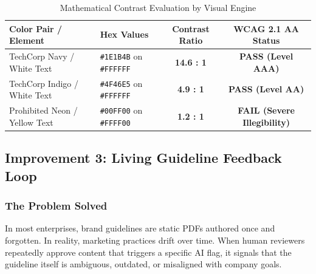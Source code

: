 \documentclass[11pt,a4paper]{article}
\begin{document}
\begin{table}[H]
\centering
\small
\begin{tabular}{@{}llcc@{}}
\toprule
\textbf{Color Pair / Element} & \textbf{Hex Values} & \textbf{Contrast Ratio} & \textbf{WCAG 2.1 AA Status} \\
\midrule
TechCorp Navy / White Text & \texttt{\#1E1B4B} on \texttt{\#FFFFFF} & \textbf{14.6 : 1} & \textcolor{successgreen}{\textbf{PASS (Level AAA)}} \\
TechCorp Indigo / White Text & \texttt{\#4F46E5} on \texttt{\#FFFFFF} & \textbf{4.9 : 1} & \textcolor{successgreen}{\textbf{PASS (Level AA)}} \\
Prohibited Neon / Yellow Text & \texttt{\#00FF00} on \texttt{\#FFFF00} & \textbf{1.2 : 1} & \textcolor{dangerred}{\textbf{FAIL (Severe Illegibility)}} \\
\bottomrule
\end{tabular}
\caption{Mathematical Contrast Evaluation by Visual Engine}
\end{table}

\newpage

\subsection{Improvement 3: Living Guideline Feedback Loop}

\subsubsection{The Problem Solved}
In most enterprises, brand guidelines are static PDFs authored once and forgotten. In reality, marketing practices drift over time. When human reviewers repeatedly approve content that triggers a specific AI flag, it signals that the guideline itself is ambiguous, outdated, or misaligned with company goals.
\end{document}
